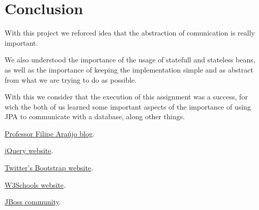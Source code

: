 \documentclass[12pt]{article}
\begin{document}
\section{Conclusion}
\indent \indent With this project we reforced idea that the abstraction of comunication is really important.

We also understood the importance of the usage of statefull and stateless beans, as well as the importance of keeping the implementation simple and as abstract from what we are trying to do as possible.

With this we consider that the execution of this assignment was a success, for wich the both of us learned some important aspects of the importance of using JPA to communicate with a database, along other things.
\clearpage

\begin{thebibliography}{9}
	\href{http://eai-course.blogspot.pt/}{Professor Filipe Araújo blog}.

	\href{http://jquery.com/}{jQuery website}.

	\href{http://getbootstrap.com/}{Twitter's Bootstrap website}.

	\href{http://www.w3schools.com/}{W3Schools website}.
	
	\href{https://community.jboss.org/}{JBoss community}.
\end{thebibliography}
\end{document}
